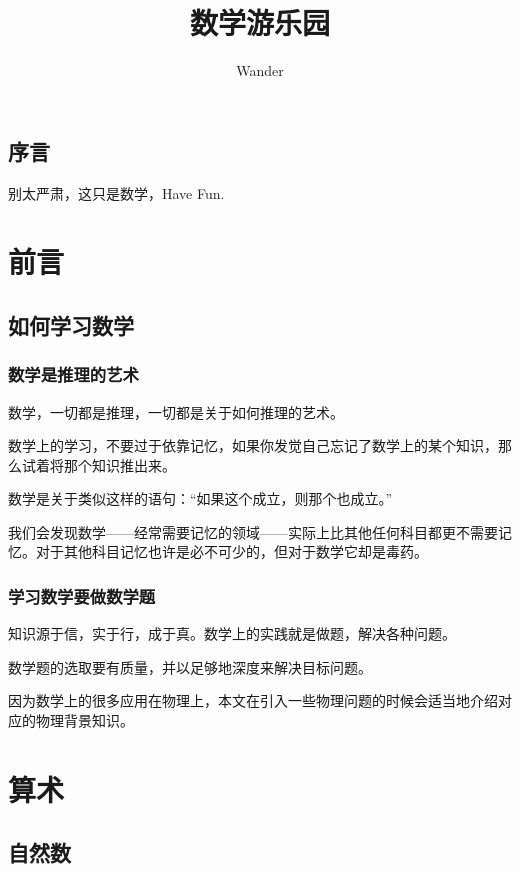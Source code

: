 \documentclass[12pt,oneside]{book}
\title{数学游乐园}
\author{Wander}
\begin{document}
\makemytitleA



\frontmatter 
{}
\chapter*{序言}
别太严肃，这只是数学，Have Fun.


\setcounter{tocdepth}{2}    
\tableofcontents



\mainmatter
\part{前言}
\chapter{如何学习数学}
\section{数学是推理的艺术}
数学，一切都是推理，一切都是关于如何推理的艺术。

数学上的学习，不要过于依靠记忆，如果你发觉自己忘记了数学上的某个知识，那么试着将那个知识推出来。

\begin{bookref}[frametitle={\cite{烧掉数学书}}]
数学是关于类似这样的语句：“如果这个成立，则那个也成立。”

我们会发现数学——经常需要记忆的领域——实际上比其他任何科目都更不需要记忆。对于其他科目记忆也许是必不可少的，但对于数学它却是毒药。
\end{bookref}

\section{学习数学要做数学题}
知识源于信，实于行，成于真。数学上的实践就是做题，解决各种问题。

数学题的选取要有质量，并以足够地深度来解决目标问题。

因为数学上的很多应用在物理上，本文在引入一些物理问题的时候会适当地介绍对应的物理背景知识。

\part{算术}
\chapter{自然数}
\end{document}
